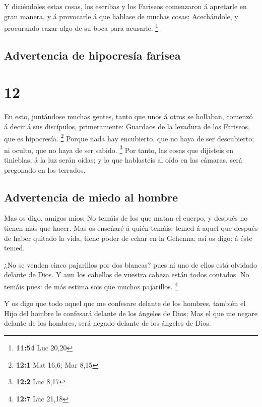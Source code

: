  Y diciéndoles estas cosas, los escribas y los Fariseos
comenzaron á apretarle en gran manera, y á provocarle á que hablase de
muchas cosas;  Acechándole, y procurando cazar algo de su
boca para acusarle. \footnote{\textbf{11:54} Luc 20,20}

\hypertarget{advertencia-de-hipocresuxeda-farisea}{%
\subsection{Advertencia de hipocresía
farisea}\label{advertencia-de-hipocresuxeda-farisea}}

\hypertarget{section-11}{%
\section{12}\label{section-11}}

 En esto, juntándose muchas gentes, tanto que unos á otros
se hollaban, comenzó á decir á sus discípulos, primeramente: Guardaos de
la levadura de los Fariseos, que es hipocresía. \footnote{\textbf{12:1}
  Mat 16,6; Mar 8,15}  Porque nada hay encubierto, que no
haya de ser descubierto; ni oculto, que no haya de ser sabido.
\footnote{\textbf{12:2} Luc 8,17}  Por tanto, las cosas que
dijisteis en tinieblas, á la luz serán oídas; y lo que hablasteis al
oído en las cámaras, será pregonado en los terrados.

\hypertarget{advertencia-de-miedo-al-hombre}{%
\subsection{Advertencia de miedo al
hombre}\label{advertencia-de-miedo-al-hombre}}

 Mas os digo, amigos míos: No temáis de los que matan el
cuerpo, y después no tienen más que hacer.  Mas os enseñaré
á quién temáis: temed á aquel que después de haber quitado la vida,
tiene poder de echar en la Gehenna: así os digo: á éste temed.

 ¿No se venden cinco pajarillos por dos blancas? pues ni uno
de ellos está olvidado delante de Dios.  Y aun los cabellos
de vuestra cabeza están todos contados. No temáis pues: de más estima
sois que muchos pajarillos. \footnote{\textbf{12:7} Luc 21,18}

 Y os digo que todo aquel que me confesare delante de los
hombres, también el Hijo del hombre le confesará delante de los ángeles
de Dios;  Mas el que me negare delante de los hombres, será
negado delante de los ángeles de Dios.

